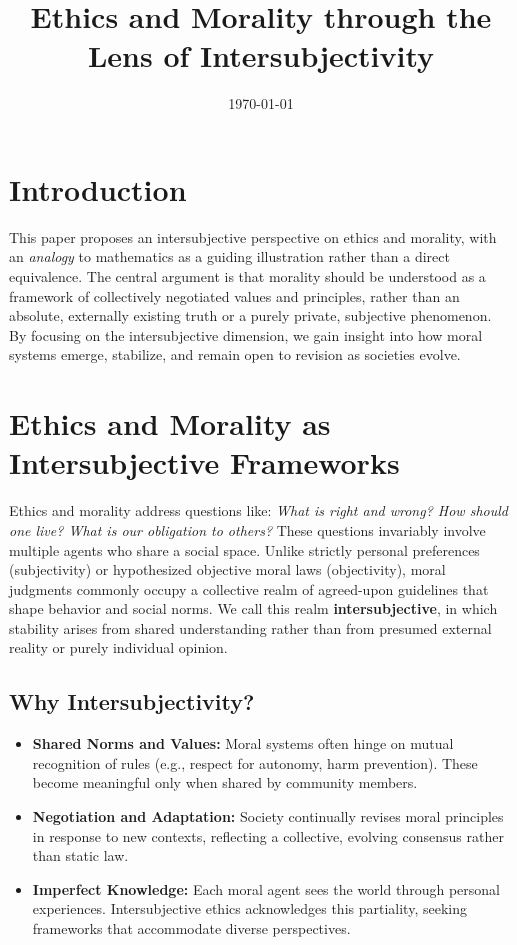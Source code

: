 \documentclass{article}
\title{Ethics and Morality through the Lens of Intersubjectivity}
\author{}
\date{\today}
\begin{document}
\maketitle

\section{Introduction}

This paper proposes an intersubjective perspective on ethics and morality, with an \emph{analogy} to mathematics as a guiding illustration rather than a direct equivalence. The central argument is that morality should be understood as a framework of collectively negotiated values and principles, rather than an absolute, externally existing truth or a purely private, subjective phenomenon. By focusing on the intersubjective dimension, we gain insight into how moral systems emerge, stabilize, and remain open to revision as societies evolve.

\section{Ethics and Morality as Intersubjective Frameworks}

Ethics and morality address questions like: \emph{What is right and wrong? How should one live? What is our obligation to others?} These questions invariably involve multiple agents who share a social space. Unlike strictly personal preferences (subjectivity) or hypothesized objective moral laws (objectivity), moral judgments commonly occupy a collective realm of agreed-upon guidelines that shape behavior and social norms. We call this realm \textbf{intersubjective}, in which stability arises from shared understanding rather than from presumed external reality or purely individual opinion.

\subsection{Why Intersubjectivity?}

\begin{itemize}
  \item \textbf{Shared Norms and Values:} Moral systems often hinge on mutual recognition of rules (e.g., respect for autonomy, harm prevention). These become meaningful only when shared by community members.
  \item \textbf{Negotiation and Adaptation:} Society continually revises moral principles in response to new contexts, reflecting a collective, evolving consensus rather than static law.
  \item \textbf{Imperfect Knowledge:} Each moral agent sees the world through personal experiences. Intersubjective ethics acknowledges this partiality, seeking frameworks that accommodate diverse perspectives.
\end{itemize}
\end{document}
